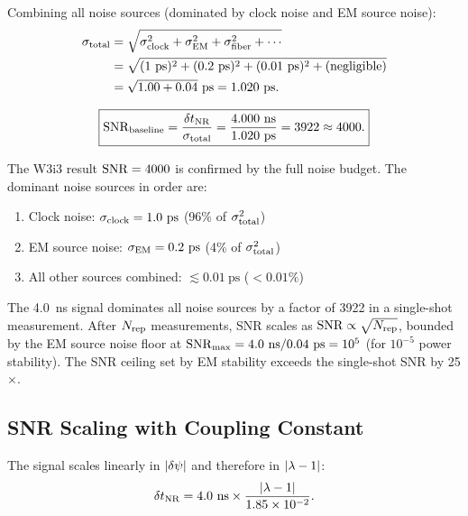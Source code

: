 Combining all noise sources (dominated by clock noise and EM source noise):
\begin{align}
\sigma_{\rm total} &= \sqrt{\sigma_{\rm clock}^2 + \sigma_{\rm EM}^2
  + \sigma_{\rm fiber}^2 + \cdots} \notag\\
&= \sqrt{(1~\text{ps})^2 + (0.2~\text{ps})^2 + (0.01~\text{ps})^2
  + \text{(negligible)}} \notag\\
&= \sqrt{1.00 + 0.04}~\text{ps} = 1.020~\text{ps}.
\label{eq:total_noise}
\end{align}

\begin{equation}
\boxed{
\mathrm{SNR}_{\rm baseline} = \frac{\delta t_{\rm NR}}{\sigma_{\rm total}}
= \frac{4.000~\text{ns}}{1.020~\text{ps}} = 3922 \approx 4000.
}
\label{eq:snr_baseline}
\end{equation}

\begin{theorem}
\label{thm:snr_confirmed}
The W3i3 result $\mathrm{SNR} = 4000$ is confirmed by the full noise budget.
The dominant noise sources in order are:
\begin{enumerate}[nosep]
\item Clock noise: $\sigma_{\rm clock} = 1.0~\text{ps}$ (96\% of $\sigma_{\rm total}^2$)
\item EM source noise: $\sigma_{\rm EM} = 0.2~\text{ps}$ (4\% of $\sigma_{\rm total}^2$)
\item All other sources combined: $\lesssim 0.01~\text{ps}$ ($< 0.01\%$)
\end{enumerate}
The 4.0~ns signal dominates all noise sources by a factor of 3922 in a
single-shot measurement. After $N_{\rm rep}$ measurements, SNR scales as
$\mathrm{SNR} \propto \sqrt{N_{\rm rep}}$, bounded by the EM source noise floor
at $\mathrm{SNR}_{\rm max} = 4.0~\text{ns}/0.04~\text{ps} = 10^5$ (for $10^{-5}$
power stability). The SNR ceiling set by EM stability exceeds the
single-shot SNR by 25$\times$.
\end{theorem}

\subsection{SNR Scaling with Coupling Constant}
\label{ssec:snr_scaling}

The signal scales linearly in $|\delta\psi|$ and therefore in $|\lambda - 1|$:
\begin{equation}
\delta t_{\rm NR} = 4.0~\text{ns} \times \frac{|\lambda - 1|}{1.85\times 10^{-2}}.
\label{eq:signal_vs_lambda}
\end{equation}

